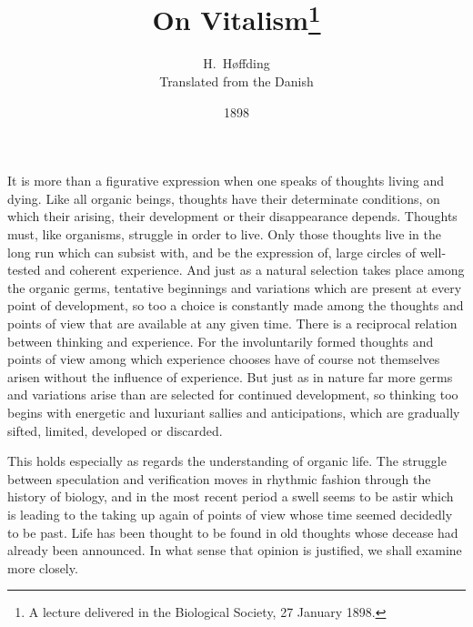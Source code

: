 \documentclass[12pt,a4paper]{article}
\title{\textbf{On Vitalism}\footnote{A lecture delivered in the Biological
Society, 27 January 1898.}}
\author{H.\ Høffding\\[4pt]
  \small Translated from the Danish}
\date{1898}
\begin{document}
\maketitle
\thispagestyle{fancy}

\bigskip

\noindent It is more than a figurative expression when one speaks of thoughts
living and dying. Like all organic beings, thoughts have their determinate
conditions, on which their arising, their development or their disappearance
depends. Thoughts must, like organisms, struggle in order to live. Only those
thoughts live in the long run which can subsist with, and be the expression of,
large circles of well-tested and coherent experience. And just as a natural
selection takes place among the organic germs, tentative beginnings and
variations which are present at every point of development, so too a choice is
constantly made among the thoughts and points of view that are available at any
given time. There is a reciprocal relation between thinking and experience. For
the involuntarily formed thoughts and points of view among which experience
chooses have of course not themselves arisen without the influence of
experience. But just as in nature far more germs and variations arise than are
selected for continued development, so thinking too begins with energetic and
luxuriant sallies and anticipations, which are gradually sifted, limited,
developed or discarded.

This holds especially as regards the understanding of organic life. The struggle
between speculation and verification moves in rhythmic fashion through the
history of biology, and in the most recent period a swell seems to be astir
which is leading to the taking up again of points of view whose time seemed
decidedly to be past. Life has been thought to be found in old thoughts
whose decease had already been announced. In what sense that opinion is
justified, we shall examine more closely.
\end{document}
